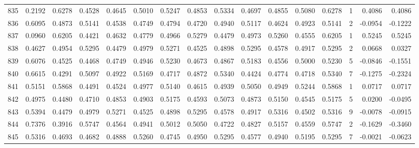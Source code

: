 \begin{tabular}{lrrrrrrrrrrrrrrr}
835 &      0.2192 &  0.6278 &  0.4528 &  0.4645 &  0.5010 &  0.5247 &  0.4853 &  0.5334 &  0.4697 &  0.4855 &   0.5080 &     0.6278 &      1 &                    0.4086 &                     0.4086 \\
836 &      0.6095 &  0.4873 &  0.5141 &  0.4538 &  0.4749 &  0.4794 &  0.4720 &  0.4940 &  0.5117 &  0.4624 &   0.4923 &     0.5141 &      2 &                   -0.0954 &                    -0.1222 \\
837 &      0.0960 &  0.6205 &  0.4421 &  0.4632 &  0.4779 &  0.4966 &  0.5279 &  0.4479 &  0.4973 &  0.5260 &   0.4555 &     0.6205 &      1 &                    0.5245 &                     0.5245 \\
838 &      0.4627 &  0.4954 &  0.5295 &  0.4479 &  0.4979 &  0.5271 &  0.4525 &  0.4898 &  0.5295 &  0.4578 &   0.4917 &     0.5295 &      2 &                    0.0668 &                     0.0327 \\
839 &      0.6076 &  0.4525 &  0.4468 &  0.4749 &  0.4946 &  0.5230 &  0.4673 &  0.4867 &  0.5183 &  0.4556 &   0.5000 &     0.5230 &      5 &                   -0.0846 &                    -0.1551 \\
840 &      0.6615 &  0.4291 &  0.5097 &  0.4922 &  0.5169 &  0.4717 &  0.4872 &  0.5340 &  0.4424 &  0.4774 &   0.4718 &     0.5340 &      7 &                   -0.1275 &                    -0.2324 \\
841 &      0.5151 &  0.5868 &  0.4491 &  0.4524 &  0.4977 &  0.5140 &  0.4615 &  0.4939 &  0.5050 &  0.4949 &   0.5244 &     0.5868 &      1 &                    0.0717 &                     0.0717 \\
842 &      0.4975 &  0.4480 &  0.4710 &  0.4853 &  0.4903 &  0.5175 &  0.4593 &  0.5073 &  0.4873 &  0.5150 &   0.4545 &     0.5175 &      5 &                    0.0200 &                    -0.0495 \\
843 &      0.5394 &  0.4479 &  0.4979 &  0.5271 &  0.4525 &  0.4898 &  0.5295 &  0.4578 &  0.4917 &  0.5316 &   0.4502 &     0.5316 &      9 &                   -0.0078 &                    -0.0915 \\
844 &      0.7376 &  0.3916 &  0.5747 &  0.4564 &  0.4941 &  0.5012 &  0.5050 &  0.4722 &  0.4827 &  0.5157 &   0.4559 &     0.5747 &      2 &                   -0.1629 &                    -0.3460 \\
845 &      0.5316 &  0.4693 &  0.4682 &  0.4888 &  0.5260 &  0.4745 &  0.4950 &  0.5295 &  0.4577 &  0.4940 &   0.5195 &     0.5295 &      7 &                   -0.0021 &                    -0.0623 \\

\end{tabular}
